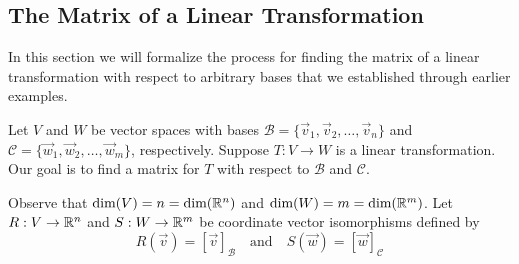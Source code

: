 \documentclass{ximera}
\begin{document}





\subsection{The Matrix of a Linear Transformation}
In this section we will formalize the process for finding the matrix of a linear transformation with respect to arbitrary bases that we established through earlier examples.

Let $V$ and $W$ be vector spaces with bases $\mathcal{B}=\{\vec{v}_1, \vec{v}_2,\ldots ,\vec{v}_n\}$ and $\mathcal{C}=\{\vec{w}_1, \vec{w}_2,\ldots ,\vec{w}_m\}$, respectively.   Suppose $T:V\rightarrow W$ is a linear transformation.  Our goal is to find a matrix for $T$ with respect to $\mathcal{B}$ and $\mathcal{C}$.

Observe that $\text{dim}(V)=n=\text{dim}(\mathbb{R}^n)$ and $\text{dim}(W)=m=\text{dim}(\mathbb{R}^m)$. Let $R:V\rightarrow \mathbb{R}^n$ and $S:W\rightarrow \mathbb{R}^m$ be coordinate vector isomorphisms defined by
$$R(\vec{v})=[\vec{v}]_{\mathcal{B}}\quad\text{and}\quad S(\vec{w})=[\vec{w}]_{\mathcal{C}}$$
\end{document}
